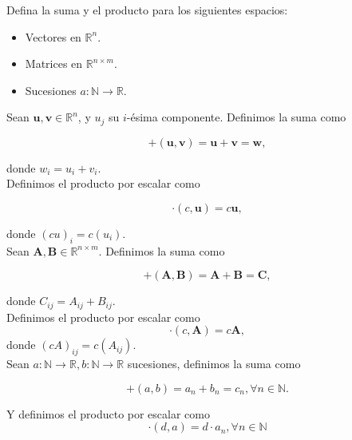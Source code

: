 \documentclass[12pt]{book}
\begin{document}
\begin{exampleenv}

Defina la suma y el producto para los siguientes espacios:
\begin{itemize}
    \item Vectores en $\mathbb{R}^n$.
    \item Matrices en $\mathbb{R}^{n\times m}$.
    \item Sucesiones $a:\mathbb{N}\to\mathbb{R}$.
\end{itemize}

Sean $\mathbf{u}, \mathbf{v}\in \mathbb{R}^n$, y $u_j$ su $i$-ésima componente. Definimos la suma como

\[+(\mathbf{u},\mathbf{v})=\mathbf{u}+\mathbf{v}=\mathbf{w},\] 

donde $w_i=u_i+v_i$.\\

Definimos el producto por escalar como

\[\cdot(c,\mathbf{u})=c\mathbf{u},\]

donde $(cu)_i=c(u_i)$. \\

Sean $\mathbf{A},\mathbf{B}\in \mathbb{R}^{n\times m}$. Definimos la suma como

\[+(\mathbf{A},\mathbf{B})=\mathbf{A}+\mathbf{B}=\mathbf{C},\]

donde $C_{ij}=A_{ij}+B_{ij}.$\\

Definimos el producto por escalar como
\[\cdot(c,\mathbf{A})=c\mathbf{A},\]
donde $(cA)_{ij}=c(A_{ij})$. \\

Sean $a:\mathbb{N}\to\mathbb{R},b:\mathbb{N}\to\mathbb{R}$ sucesiones, definimos la suma como

\[+(a,b)=a_n+b_n=c_n,\forall n\in \mathbb{N}.\]

Y definimos el producto por escalar como
\[\cdot(d,a)=d\cdot a_n, \forall n\in\mathbb{N}\] 
\end{exampleenv}
\end{document}
